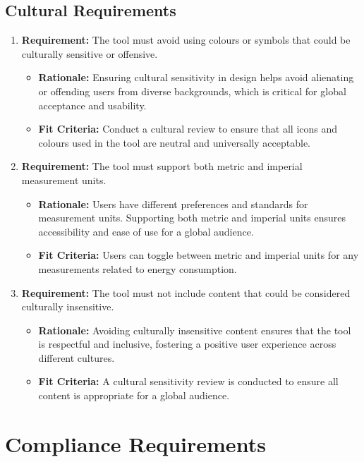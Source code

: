 \documentclass[12pt]{article}
\begin{document}
\subsection{Cultural Requirements}
\begin{enumerate}
  \item \textbf{Requirement:} The tool must avoid using colours or symbols that could be culturally sensitive or offensive.
  \begin{itemize}
      \item \textbf{Rationale:}  Ensuring cultural sensitivity in design helps avoid alienating or offending users from diverse backgrounds, which is critical for global acceptance and usability.
      \item \textbf{Fit Criteria:} Conduct a cultural review to ensure that all icons and colours used in the tool are neutral and universally acceptable.
  \end{itemize}
  
  \item \textbf{Requirement:} The tool must support both metric and imperial measurement units.
  \begin{itemize}
      \item \textbf{Rationale:} Users have different preferences and standards for measurement units. Supporting both metric and imperial units ensures accessibility and ease of use for a global audience.
      \item \textbf{Fit Criteria:} Users can toggle between metric and imperial units for any measurements related to energy consumption.
  \end{itemize}   
  
  \item \textbf{Requirement:} The tool must not include content that could be considered culturally insensitive.
  \begin{itemize}
      \item \textbf{Rationale:} Avoiding culturally insensitive content ensures that the tool is respectful and inclusive, fostering a positive user experience across different cultures.
      \item \textbf{Fit Criteria:} A cultural sensitivity review is conducted to ensure all content is appropriate for a global audience.
  \end{itemize}

\end{enumerate}

\section{Compliance Requirements}
\end{document}
